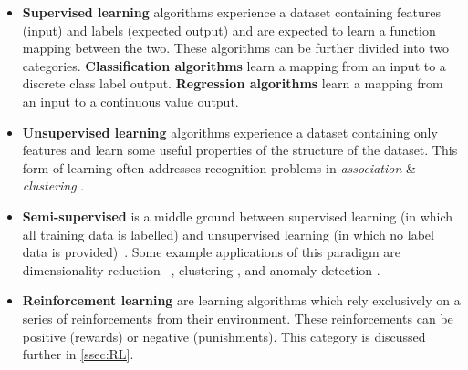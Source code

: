 \begin{itemize}
    \item \textbf{Supervised learning} algorithms experience a dataset
    containing features (input) and labels (expected output) and are expected
    to learn a function mapping between the two. These algorithms can be further
    divided into two categories. \textbf{Classification algorithms} learn a
    mapping from an input to a discrete class label output. \textbf{Regression
    algorithms} learn a mapping from an input to a continuous value output.


    \item \textbf{Unsupervised learning} algorithms experience a dataset
    containing only features and learn some useful properties of the structure
    of the dataset. This form of learning often addresses recognition problems
    in \textit{association} \& \textit{clustering} \cite{barlow1999ul}.

    \item \textbf{Semi-supervised} is a middle ground between supervised
    learning (in which all training data is labelled) and unsupervised learning
    (in which no label data is provided)~\cite{books/mit/06/CSZ2006}. Some
    example applications of this paradigm are dimensionality reduction
    ~\cite{Zhang2007}, clustering \cite{Bair2013}, and anomaly detection
    \cite{DBLP:journals/corr/abs-1805-06725}.

    \item \textbf{Reinforcement learning} are learning algorithms which rely
    exclusively on a series of reinforcements from their environment. These
    reinforcements can be positive (rewards) or negative (punishments). This
    category is discussed further in \autoref{ssec:RL}.
\end{itemize}

